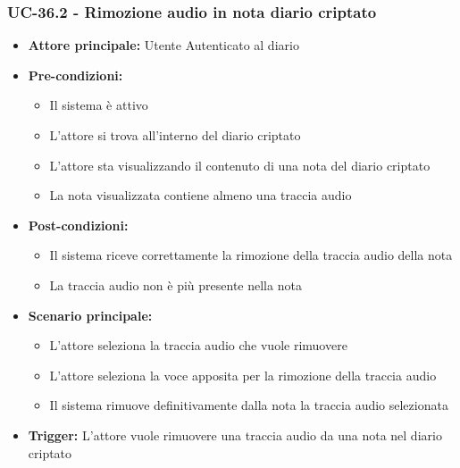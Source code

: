 \documentclass[a4paper,12pt]{article}
\begin{document}
\subsubsection{UC-36.2 - Rimozione audio in nota diario criptato} \label{subsec:UC-36.2}
\begin{itemize}
    \item \textbf{Attore principale:} Utente Autenticato al diario
    \item \textbf{Pre-condizioni:}
    \begin{itemize}
        \item Il sistema è attivo
        \item L'attore si trova all'interno del diario criptato
        \item L'attore sta visualizzando il contenuto di una nota del diario criptato
        \item La nota visualizzata contiene almeno una traccia audio
    \end{itemize}
    \item \textbf{Post-condizioni:}
    \begin{itemize}
        \item Il sistema riceve correttamente la rimozione della traccia audio della nota
        \item La traccia audio non è più presente nella nota
    \end{itemize}
    \item \textbf{Scenario principale:}
    \begin{itemize}
        \item L'attore seleziona la traccia audio che vuole rimuovere
        \item L'attore seleziona la voce apposita per la rimozione della traccia audio
        \item Il sistema rimuove definitivamente dalla nota la traccia audio selezionata
    \end{itemize}
    \item \textbf{Trigger:} L'attore vuole rimuovere una traccia audio da una nota nel diario criptato
\end{itemize}
\end{document}
